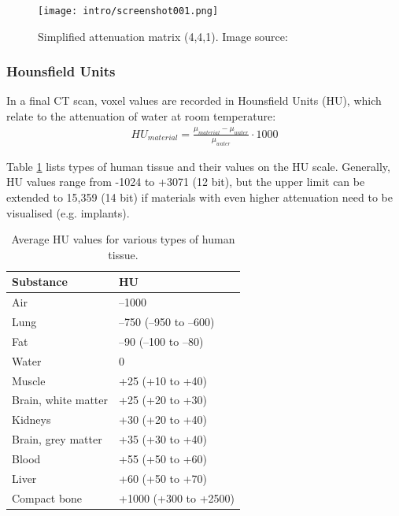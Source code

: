 \begin{figure}[!htb]
	\centering
	\texttt{[image: intro/screenshot001.png]}
	\caption{Simplified attenuation matrix (4,4,1). Image source: \cite{Maidment2014}}
	\label{fig:voxel_matrix}
\end{figure}

\subsubsection{Hounsfield Units}

In a final CT scan, voxel values are recorded in Hounsfield Units (HU), which relate to the attenuation of water at room temperature:
\begin{align}
HU_{material} = \frac{\mu_{material} - \mu_{water}}{\mu_{water}} \cdot 1000
\end{align}

Table \ref{tab:HU} lists types of human tissue and their values on the HU scale.
Generally, HU values range from -1024 to +3071 (12 bit), but the upper limit can be extended to 15,359 (14 bit) if materials with even higher attenuation need to be visualised (e.g. implants). \\

\begin{table}[]
	\centering
	\caption{Average HU values for various types of human tissue.}
	\label{tab:HU}
	\begin{tabular}{@{}ll@{}}
		Substance           & HU                     \\
		\toprule
		Air                 & –1000                  \\
		Lung                & –750 (–950 to –600)    \\
		Fat                 & –90 (–100 to –80)      \\
		Water               & 0                      \\
		Muscle              & +25 (+10 to +40)       \\
		Brain, white matter & +25 (+20 to +30)       \\
		Kidneys             & +30 (+20 to +40)       \\
		Brain, grey matter  & +35 (+30 to +40)       \\
		Blood               & +55 (+50 to +60)       \\
		Liver               & +60 (+50 to +70)       \\
		Compact bone        & +1000 (+300 to +2500)
	\end{tabular}
\end{table}

